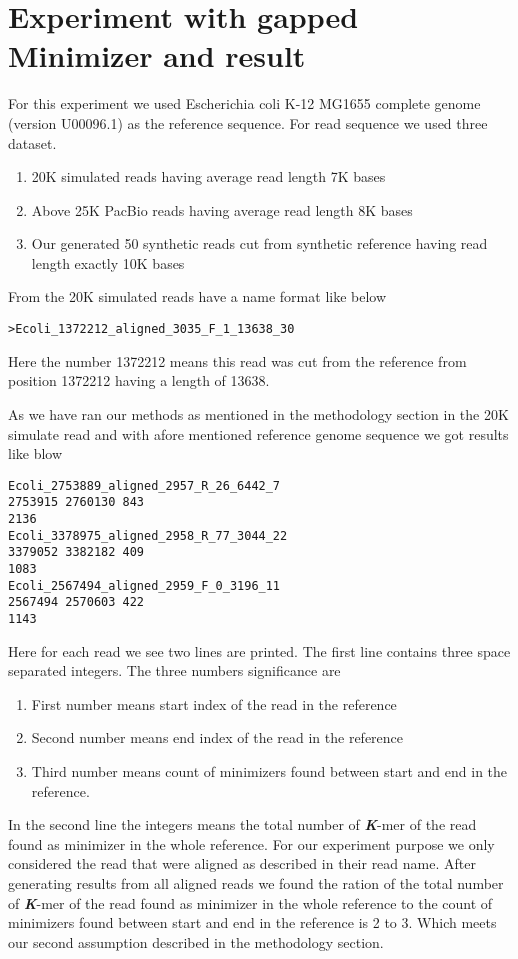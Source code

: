 \documentclass{standalone}
\begin{document}
\section{Experiment with gapped Minimizer and result}
For this experiment we used Escherichia coli K-12 MG1655 complete genome (version U00096.1) as the reference sequence. For read sequence we used three dataset.
	\begin{enumerate}
		\item 20K simulated reads having average read length 7K bases
		\item Above 25K PacBio reads having average read length 8K bases
		\item Our generated 50 synthetic reads cut  from synthetic reference having read length exactly 10K bases
	\end{enumerate}
From the 20K simulated reads have a name format like below
\begin{verbatim}
>Ecoli_1372212_aligned_3035_F_1_13638_30
\end{verbatim}
Here the number 1372212 means this read was cut from the reference from position  1372212 having a length of 13638.
\par 
As we have ran our methods as mentioned in the methodology section in the 20K simulate read and with afore mentioned reference genome sequence we got results like blow
\begin{verbatim}
Ecoli_2753889_aligned_2957_R_26_6442_7
2753915 2760130 843
2136
Ecoli_3378975_aligned_2958_R_77_3044_22
3379052 3382182 409
1083
Ecoli_2567494_aligned_2959_F_0_3196_11
2567494 2570603 422
1143
\end{verbatim}
Here for each read we see two lines are printed. The first line contains three space separated integers. The three numbers significance are
\begin{enumerate}
	\item First number means start index of the read in the reference
	\item Second number means end index of the read in the reference
	\item Third number means count of minimizers found between start and end in the reference.
\end{enumerate}
In the second line the integers means the total number of {\bf \emph{K}}-mer of the read found as minimizer in the whole reference.
For our experiment purpose we only considered the read that were aligned as described in their read name. After generating results from all aligned reads we found the ration of  the total number of {\bf \emph{K}}-mer of the read found as minimizer in the whole reference to the count of minimizers found between start and end in the reference is 2 to 3. Which meets our second assumption described in the methodology section.
\end{document}
